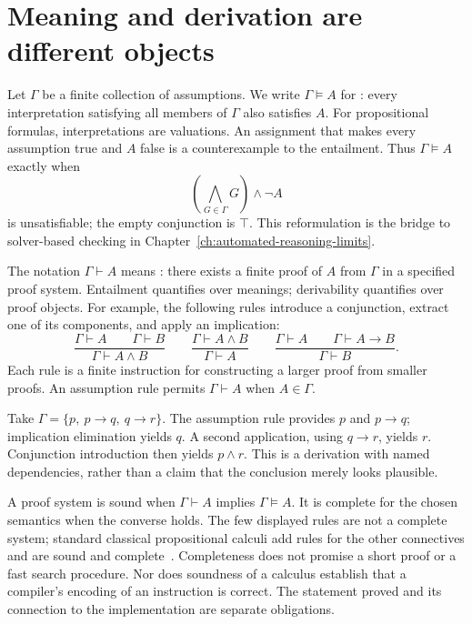 \section{Meaning and derivation are different objects}
\label{sec:ch40-entailment}

Let $\Gamma$ be a finite collection of assumptions.
We write $\Gamma\models A$ for : every interpretation satisfying all members of $\Gamma$ also satisfies $A$.
For propositional formulas, interpretations are valuations.
An assignment that makes every assumption true and $A$ false is a counterexample to the entailment.
Thus $\Gamma\models A$ exactly when
\[
  \left(\bigwedge_{G\in\Gamma}G\right)\land\neg A
\]
is unsatisfiable; the empty conjunction is $\top$.
This reformulation is the bridge to solver-based checking in Chapter~\ref{ch:automated-reasoning-limits}.

The notation $\Gamma\vdash A$ means : there exists a finite proof of $A$ from $\Gamma$ in a specified proof system.
Entailment quantifies over meanings; derivability quantifies over proof objects.
For example, the following rules introduce a conjunction, extract one of its components, and apply an implication:
\[
  \frac{\Gamma\vdash A\qquad\Gamma\vdash B}{\Gamma\vdash A\land B}
  \qquad
  \frac{\Gamma\vdash A\land B}{\Gamma\vdash A}
  \qquad
  \frac{\Gamma\vdash A\qquad\Gamma\vdash A\rightarrow B}
       {\Gamma\vdash B}.
\]
Each rule is a finite instruction for constructing a larger proof from smaller proofs.
An assumption rule permits $\Gamma\vdash A$ when $A\in\Gamma$.

Take $\Gamma=\{p,\ p\rightarrow q,\ q\rightarrow r\}$.
The assumption rule provides $p$ and $p\rightarrow q$; implication elimination yields $q$.
A second application, using $q\rightarrow r$, yields $r$.
Conjunction introduction then yields $p\land r$.
This is a derivation with named dependencies, rather than a claim that the conclusion merely looks plausible.

A proof system is sound when $\Gamma\vdash A$ implies $\Gamma\models A$.
It is complete for the chosen semantics when the converse holds.
The few displayed rules are not a complete system; standard classical propositional calculi add rules for the other connectives and are sound and complete~\cite{huth-2004-logic}.
Completeness does not promise a short proof or a fast search procedure.
Nor does soundness of a calculus establish that a compiler's encoding of an instruction is correct.
The statement proved and its connection to the implementation are separate obligations.


